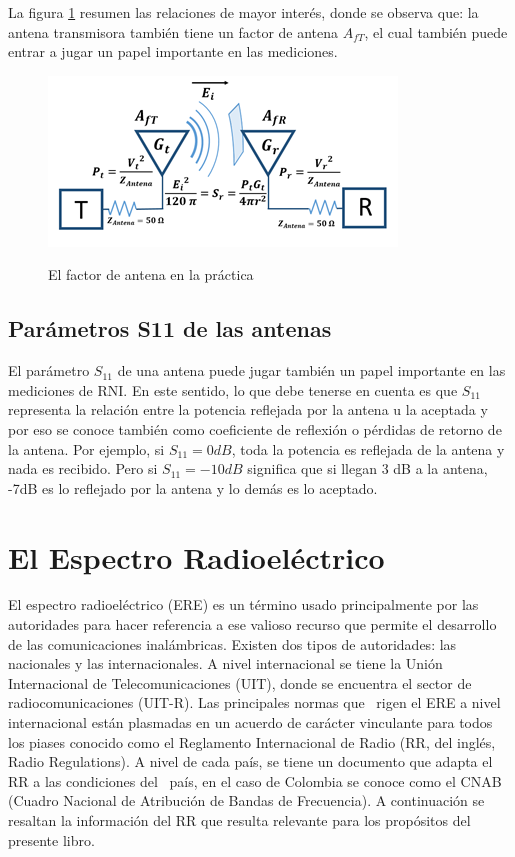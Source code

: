 La figura \ref{fig:Factor-antena} resumen las relaciones de mayor interés, donde se observa que: la antena transmisora también tiene un factor de antena $A_{fT}$, el cual también puede entrar a jugar un papel importante en las mediciones. \\ 

\begin{figure}[h!]
	\captionsetup{justification = raggedright, singlelinecheck = false}
	\caption{El factor de antena en la práctica} 
	\centering
	\includegraphics[scale=1]{Imagenes/Factor-antena.png}
	\label{fig:Factor-antena}
\end{figure}

\subsection{Parámetros S11 de las antenas}

El parámetro $S_{11}$ de una antena puede jugar también un papel importante en las mediciones de RNI. En este sentido, lo que debe tenerse en cuenta es que $S_{11}$ representa la relación entre la potencia reflejada por la antena u la aceptada y por eso se conoce también como coeficiente de reflexión o pérdidas de retorno de la antena. Por ejemplo, si $S_{11}=0dB$, toda la potencia es reflejada de la antena y nada es recibido. Pero si $S_{11}=-10 dB$ significa que si llegan 3 dB a la antena, -7dB es lo reflejado por la antena y lo demás es lo aceptado. 

\section{El Espectro Radioeléctrico}
El espectro radioeléctrico (ERE) es un término usado principalmente por las autoridades para hacer referencia a ese valioso recurso que permite el desarrollo de las comunicaciones inalámbricas.
Existen dos tipos de autoridades: las nacionales y las internacionales. A nivel internacional se tiene la Unión Internacional de Telecomunicaciones (UIT), donde se encuentra el sector de radiocomunicaciones (UIT-R). Las principales normas que \
rigen el ERE a nivel internacional están plasmadas en un acuerdo de carácter vinculante para todos los piases conocido como el Reglamento Internacional de Radio (RR, del inglés, Radio Regulations). A nivel de cada país, se tiene un documento que adapta el RR a las condiciones del \
país, en el caso de Colombia se conoce como el CNAB (Cuadro Nacional de Atribución de Bandas de Frecuencia). A continuación se resaltan la información del RR que resulta relevante para los propósitos del presente libro.

